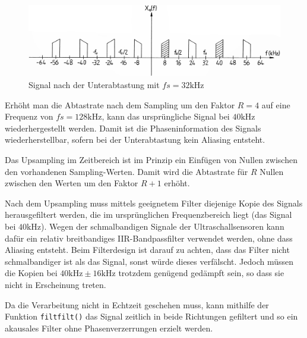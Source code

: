 \begin{figure}[htb]
\begin{center}
\includegraphics[width=\textwidth]{graphics/image_grundlagen_unterabtastung.png}
\end{center}
\caption{Signal nach der Unterabtastung mit $fs = 32 \mathrm{kHz}$} %
\label{fig:image_grundlagen_unterabtastung}
\end{figure}
%

Erhöht man die Abtastrate nach dem Sampling um den Faktor $R = 4$ auf eine Frequenz von $fs = 128 \mathrm{kHz}$, kann das ursprüngliche Signal bei $40 \mathrm{kHz}$ wiederhergestellt werden. Damit ist die Phaseninformation des Signals wiederherstellbar, sofern bei der Unterabtastung kein Aliasing entsteht.

Das Upsampling im Zeitbereich ist im Prinzip ein Einfügen von Nullen zwischen den vorhandenen Sampling-Werten. Damit wird die Abtastrate für $R$ Nullen zwischen den Werten um den Faktor $R + 1$ erhöht.

Nach dem Upsampling muss mittels geeignetem Filter diejenige Kopie des Signals herausgefiltert werden, die im ursprünglichen Frequenzbereich liegt (das Signal bei $40 \mathrm{kHz}$).
Wegen der schmalbandigen Signale der Ultraschallsensoren kann dafür ein relativ breitbandiges IIR-Bandpassfilter verwendet werden, ohne dass Aliasing entsteht. Beim Filterdesign ist darauf zu achten, dass das Filter nicht schmalbandiger ist als das Signal, sonst würde dieses verfälscht. Jedoch müssen die Kopien bei  $40 \mathrm{kHz} \pm 16 \mathrm{kHz}$ trotzdem genügend gedämpft sein, so dass sie nicht in Erscheinung treten.

Da die Verarbeitung nicht in Echtzeit geschehen muss, kann mithilfe der Funktion \texttt{filtfilt()} das Signal zeitlich in beide Richtungen gefiltert und so ein akausales Filter ohne Phasenverzerrungen erzielt werden.

